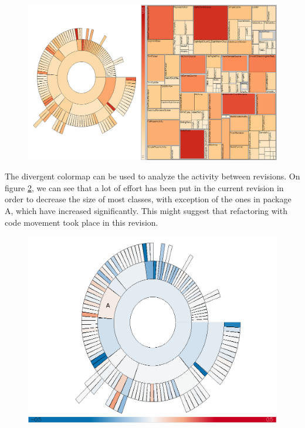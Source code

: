 \begin{figure}[H]
  \centering
  \includegraphics[width=1\textwidth]{figures/colormap_hier.png}
  \caption{}
  \label{fig:colormap_hier}
\end{figure}

The divergent colormap can be used to analyze the activity between revisions. On figure \ref{fig:colormap_div_sun}, we can see that a lot of effort has been put in the current revision in order to decrease the size of most classes, with exception of the ones in package A, which have increased significantly. This might suggest that refactoring with code movement took place in this revision.

\begin{figure}[H]
  \centering
  \includegraphics[width=1.0\textwidth]{figures/colormap_div_sun.png}
  \caption{}
  \label{fig:colormap_div_sun}
\end{figure}

